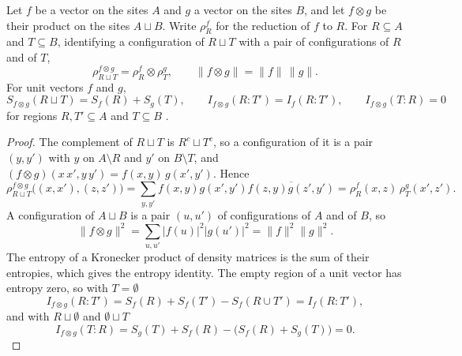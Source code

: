 \begin{theorem}
    \label{thm:finite_product_sum_sites}
    \leanok
    Let $f$ be a vector on the sites $A$ and $g$ a vector on the sites $B$, and let
    $f\otimes g$ be their product on the sites $A\sqcup B$. Write $\rho^f_R$ for the
    reduction of $f$ to $R$. For $R\subseteq A$ and $T\subseteq B$, identifying a
    configuration of $R\sqcup T$ with a pair of configurations of $R$ and of $T$,
    \[
        \rho^{f\otimes g}_{R\sqcup T}=\rho^f_R\otimes\rho^g_T,\qquad
        \lVert f\otimes g\rVert=\lVert f\rVert\,\lVert g\rVert .
    \]
    For unit vectors $f$ and $g$,
    \[
        S_{f\otimes g}(R\sqcup T)=S_f(R)+S_g(T),\qquad
        I_{f\otimes g}(R:T')=I_f(R:T'),\qquad
        I_{f\otimes g}(T:R)=0
    \]
    for regions $R,T'\subseteq A$ and $T\subseteq B$
    \cite[Proposition~10.2]{OpenAI2026AreaLaw}.
\end{theorem}
\begin{proof}\leanok
    The complement of $R\sqcup T$ is $R^c\sqcup T^c$, so a configuration of it is a
    pair $(y,y')$ with $y$ on $A\setminus R$ and $y'$ on $B\setminus T$, and
    $(f\otimes g)(x\,x',y\,y')=f(x,y)\,g(x',y')$. Hence
    \[
        \rho^{f\otimes g}_{R\sqcup T}\bigl((x,x'),(z,z')\bigr)
        =\sum_{y,y'}f(x,y)g(x',y')\overline{f(z,y)g(z',y')}
        =\rho^f_R(x,z)\,\rho^g_T(x',z').
    \]
    A configuration of $A\sqcup B$ is a pair $(u,u')$ of configurations of $A$ and
    of $B$, so
    \[
        \lVert f\otimes g\rVert^2=\sum_{u,u'}\lvert f(u)\rvert^2\lvert g(u')\rvert^2
        =\lVert f\rVert^2\lVert g\rVert^2 .
    \]
    The entropy of a Kronecker product of density matrices is the sum of their
    entropies, which gives the entropy identity. The empty region of a unit vector
    has entropy zero, so with $T=\emptyset$
    \[
        I_{f\otimes g}(R:T')=S_f(R)+S_f(T')-S_f(R\cup T')=I_f(R:T'),
    \]
    and with $R\sqcup\emptyset$ and $\emptyset\sqcup T$
    \[
        I_{f\otimes g}(T:R)=S_g(T)+S_f(R)-\bigl(S_f(R)+S_g(T)\bigr)=0 .
    \]
\end{proof}

